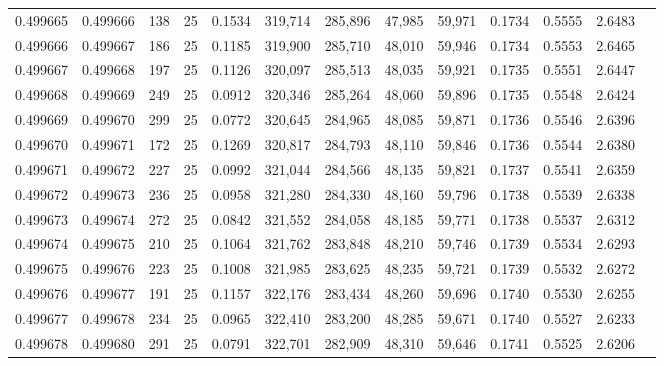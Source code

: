 \begin{tabular}{rrrrrrrrrrrrr}
0.499665 & 0.499666 & 138 &  25 &                                     0.1534 & 319,714 & 285,896 &  47,985 &  59,971 & 0.1734 & 0.5555 & 2.6483 \\
0.499666 & 0.499667 & 186 &  25 &                                     0.1185 & 319,900 & 285,710 &  48,010 &  59,946 & 0.1734 & 0.5553 & 2.6465 \\
0.499667 & 0.499668 & 197 &  25 &                                     0.1126 & 320,097 & 285,513 &  48,035 &  59,921 & 0.1735 & 0.5551 & 2.6447 \\
0.499668 & 0.499669 & 249 &  25 &                                     0.0912 & 320,346 & 285,264 &  48,060 &  59,896 & 0.1735 & 0.5548 & 2.6424 \\
0.499669 & 0.499670 & 299 &  25 &                                     0.0772 & 320,645 & 284,965 &  48,085 &  59,871 & 0.1736 & 0.5546 & 2.6396 \\
0.499670 & 0.499671 & 172 &  25 &                                     0.1269 & 320,817 & 284,793 &  48,110 &  59,846 & 0.1736 & 0.5544 & 2.6380 \\
0.499671 & 0.499672 & 227 &  25 &                                     0.0992 & 321,044 & 284,566 &  48,135 &  59,821 & 0.1737 & 0.5541 & 2.6359 \\
0.499672 & 0.499673 & 236 &  25 &                                     0.0958 & 321,280 & 284,330 &  48,160 &  59,796 & 0.1738 & 0.5539 & 2.6338 \\
0.499673 & 0.499674 & 272 &  25 &                                     0.0842 & 321,552 & 284,058 &  48,185 &  59,771 & 0.1738 & 0.5537 & 2.6312 \\
0.499674 & 0.499675 & 210 &  25 &                                     0.1064 & 321,762 & 283,848 &  48,210 &  59,746 & 0.1739 & 0.5534 & 2.6293 \\
0.499675 & 0.499676 & 223 &  25 &                                     0.1008 & 321,985 & 283,625 &  48,235 &  59,721 & 0.1739 & 0.5532 & 2.6272 \\
0.499676 & 0.499677 & 191 &  25 &                                     0.1157 & 322,176 & 283,434 &  48,260 &  59,696 & 0.1740 & 0.5530 & 2.6255 \\
0.499677 & 0.499678 & 234 &  25 &                                     0.0965 & 322,410 & 283,200 &  48,285 &  59,671 & 0.1740 & 0.5527 & 2.6233 \\
0.499678 & 0.499680 & 291 &  25 &                                     0.0791 & 322,701 & 282,909 &  48,310 &  59,646 & 0.1741 & 0.5525 & 2.6206 \\

\end{tabular}
